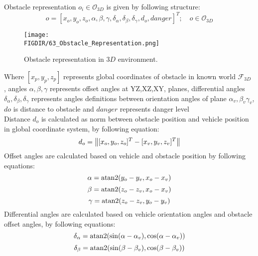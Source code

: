 \begin{definition}{Obstacle representation $o_i\in\mathscr{O}_{3D}$}\label{def:3dobstacleDefinition}
is given by following structure:
    \begin{equation}
        o = [x_o,y_o,z_o,\alpha,\beta,\gamma,\delta_\alpha,\delta_\beta,\delta_\gamma,d_o,danger]^T;\quad o \in\mathscr{O}_{3D}
    \end{equation}

\begin{figure}[H]
    \centering
    \texttt{[image: \\FIGDIR/63\_Obstacle\_Representation.png]}
    \caption{Obstacle representation in $3D$ environment.}
    \label{fig:63ObstacleRepresentation}
\end{figure}

\noindent Where $[x_p,y_p,z_p]$ represents global coordinates of obstacle in known world $\mathscr{F}_{3D}$ , angles $\alpha,\beta,\gamma$ represents offset angles at YZ,XZ,XY, planes, differential angles $\delta_\alpha,\delta_\beta,\delta_\gamma$ represents angles definitions between orientation angles of plane $\alpha_v,\beta_v\gamma_v$, $do$ is distance to obstacle and $danger$ represents danger level\\
\newpage\noindent Distance $d_o$ is calculated as norm between obstacle position and vehicle position in global coordinate system, by following equation:
    \begin{equation}
        d_o = \left\lVert[x_o,y_o,z_o]^T-[x_v,y_v,z_v]^T\right\rVert
    \end{equation}
Offset angles are calculated based on vehicle and obstacle position by following equations:
    \begin{equation}
        \alpha=\textnormal{atan2}(y_o-y_v,x_o-x_v)
    \end{equation}
    \begin{equation}
        \beta=\textnormal{atan2}(z_o-z_v,x_o-x_v)
    \end{equation}
    \begin{equation}
        \gamma=\textnormal{atan2}(z_o-z_v,y_o-y_v)
    \end{equation}
Differential angles are calculated based on vehicle orientation angles and obstacle offset angles, by following equations:
    \begin{equation}
        \delta_\alpha = \textnormal{atan2}(\sin(\alpha-\alpha_v),\cos(\alpha-\alpha_v))
    \end{equation}
    \begin{equation}
        \delta_\beta = \textnormal{atan2}(\sin(\beta-\beta_v),\cos(\beta-\beta_v))

\end{equation}
\end{definition}
